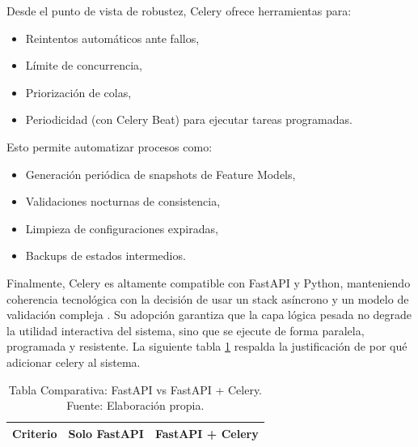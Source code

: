 {{        Desde el punto de vista de robustez, Celery ofrece herramientas para:
        \begin{itemize}
            \item Reintentos automáticos ante fallos,
            
            \item Límite de concurrencia,
            
            \item Priorización de colas,
            
            \item Periodicidad (con Celery Beat) para ejecutar tareas programadas.
        \end{itemize}

        Esto permite automatizar procesos como:
        \begin{itemize}
            \item Generación periódica de snapshots de Feature Models,
            
            \item Validaciones nocturnas de consistencia,
            
            \item Limpieza de configuraciones expiradas,
            
            \item Backups de estados intermedios.
        \end{itemize}

        Finalmente, Celery es altamente compatible con FastAPI y Python, manteniendo 
        coherencia tecnológica con la decisión de usar un stack asíncrono y un modelo 
        de validación compleja \citep{celery2024docs, ramirez2019fastapi}. Su adopción garantiza que la capa lógica pesada no 
        degrade la utilidad interactiva del sistema, sino que se ejecute de forma 
        paralela, programada y resistente. La siguiente tabla \ref{tab:fastAPIvsFastAPIconCelery} 
        respalda la justificación de por qué adicionar celery al sistema.

        \begin{longtable}{|p{5cm}|p{5cm}|p{5cm}|}
            \caption{Tabla Comparativa: FastAPI vs FastAPI + Celery. Fuente: Elaboración propia. \label{tab:fastAPIvsFastAPIconCelery}}\\
            \hline
            \rowcolor[HTML]{CBCEFB} 
            \textbf{Criterio} & \textbf{Solo FastAPI} & \textbf{FastAPI + Celery} \\
            \hline
            \endfirsthead
            

\end{longtable}}}
